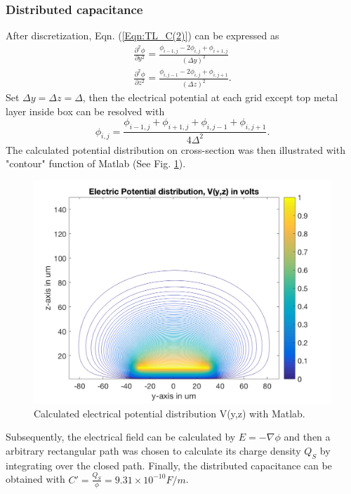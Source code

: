 \documentclass[11pt,final]{scrbook}
\begin{document}
\subsubsection{Distributed capacitance}
After discretization, Eqn. (\ref{Eqn:TL_C(2)}) can be expressed as
\begin{align}
\frac { { \partial  }^{ 2 }\phi  }{ \partial { y }^{ 2 } } =\frac { { \phi  }_{ i-1,j }-2{ \phi  }_{ i,j }+{ \phi  }_{ i+1,j } }{ { (\Delta y) }^{ 2 } }\\
\frac { { \partial  }^{ 2 }\phi  }{ \partial { z }^{ 2 } } =\frac { { \phi  }_{ i,j-1 }-2{ \phi  }_{ i,j }+{ \phi  }_{ i,j+1 } }{ { (\Delta z) }^{ 2 } }.
\end{align}
Set $\Delta y=\Delta z=\Delta$, then the electrical potential at each grid except top metal layer inside box can be resolved with
\begin{equation}
{ \phi  }_{ i,j }=\frac { { \phi  }_{ i-1,j }+{ \phi  }_{ i+1,j }+{ \phi  }_{ i,j-1 }+{ \phi  }_{ i,j+1 } }{ 4\Delta ^{ 2 } }.
\end{equation}
The calculated potential distribution on cross-section was then illustrated with "contour" function of Matlab (See Fig. \ref{fig:TL_C}).
\begin{figure}[htbp]
\begin{center}
\includegraphics[scale=0.3]{images/TL_C.pdf}
\caption{Calculated electrical potential distribution V(y,z) with Matlab.}
\label{fig:TL_C}
\end{center}
\end{figure}

Subsequently, the electrical field can be calculated by $E=-\nabla \phi$ and then a arbitrary rectangular path was chosen to calculate its charge density $Q_{S}$ by integrating over the closed path. Finally, the distributed capacitance can be obtained with
 $C'=\frac{Q_{S}}{\phi}=9.31\times 10^{-10} F/m$.
\end{document}
